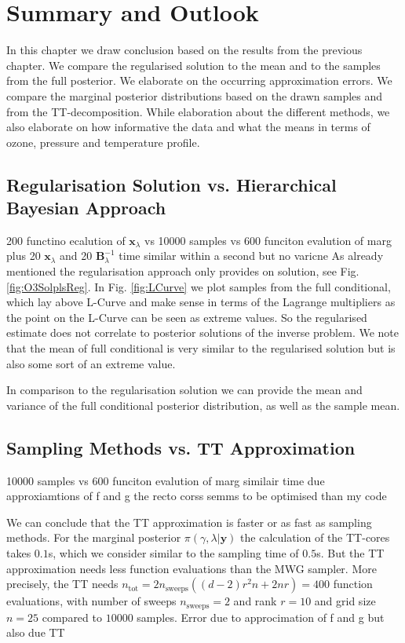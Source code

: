 \chapter{Summary and Outlook}
\label{ch:Concl}
In this chapter we draw conclusion based on the results from the previous chapter.
We compare the regularised solution to the mean and to the samples from the full posterior.
We elaborate on the occurring approximation errors.
We compare the marginal posterior distributions based on the drawn samples and from the TT-decomposition.
While elaboration about the different methods, we also elaborate on how informative the data and what the means in terms of ozone, pressure and temperature profile. 


\section{Regularisation Solution vs. Hierarchical Bayesian Approach}
200 functino ecalution of $\bm{x}_{\lambda}$
vs 10000 samples vs 600 funciton evalution  of marg plus 20 $\bm{x}_{\lambda}$ and 20 $\bm{B}^{-1}_{\lambda}$
time similar within a second
but no varicne
As already mentioned the regularisation approach only provides on solution, see Fig. \ref{fig:O3SolplsReg}.
In Fig. \ref{fig:LCurve} we plot samples from the full conditional, which lay above L-Curve and make sense in terms of the Lagrange multipliers as the point on the L-Curve can be seen as extreme values.
So the regularised estimate does not correlate to posterior solutions of the inverse problem.
We note that the mean of full conditional is very similar to the regularised solution but is also some sort of an extreme value.

In comparison to the regularisation solution we can provide the mean and variance of the full conditional posterior distribution, as well as the sample mean.


\section{Sampling Methods vs. TT Approximation}





10000 samples
vs 600 funciton evalution  of marg
similair time due approxiamtions of f and g the recto corss semms to be optimised than my code

We can conclude that the TT approximation is faster or as fast as sampling methods.
For the marginal posterior $\pi(\gamma, \lambda | \bm{y})$ the calculation of the TT-cores takes $0.1$s, which we consider similar to the sampling time of $0.5$s.
But the TT approximation needs less function evaluations than the MWG sampler.
More precisely, the TT needs $n_{\text{tot}} = 2n_{\text{sweeps}}((d-2)r^2n+ 2nr) = 400$ function evaluations, with number of sweeps $n_{\text{sweeps}} =2$ and rank $r=10$ and grid size $n = 25$ compared to $10000$ samples.
Error due to approcimation of f and g but also due TT



